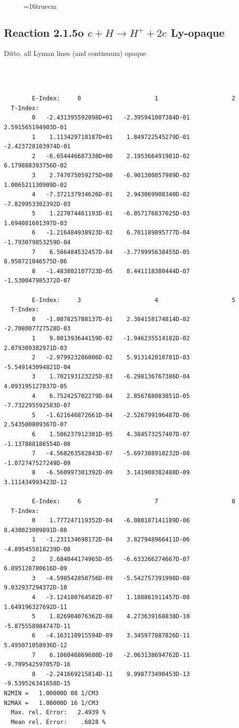 \documentclass[12pt,dvipdfmx]{article}
\begin{document}
\begin{figure} \label{2.1.5iFU}
\epsfxsize=16truecm
\end{figure}
\newpage


\subsection{
Reaction 2.1.5o $ e + H \rightarrow H^+ + 2e $  Ly-opaque}


Ditto, all Lyman lines (and continuum) opaque


\begin{small}\begin{verbatim}



        E-Index:     0                     1                     2
  T-Index:
        0   -2.431395592098D+01   -2.395941007384D-01    2.591565194903D-01
        1    1.113429718187D+01    1.849722545279D-01   -2.423728103974D-01
        2   -6.654446687338D+00    2.195366491981D-02    6.179888393756D-02
        3    2.747075059275D+00   -6.901300857989D-02    1.006521130909D-02
        4   -7.372137934626D-01    2.943069908340D-02   -7.829953302392D-03
        5    1.227074461193D-01   -6.057176837025D-03    1.694081601397D-03
        6   -1.216484938923D-02    6.701189895777D-04   -1.793079853259D-04
        7    6.566484532457D-04   -3.779995638455D-05    8.950721046575D-06
        8   -1.483802107723D-05    8.441118380444D-07   -1.530047985372D-07

        E-Index:     3                     4                     5
  T-Index:
        0   -1.087825788137D-01    2.304158174814D-02   -2.708007727528D-03
        1    9.801393644159D-02   -1.946235514182D-02    2.079309382971D-03
        2   -2.979923286006D-02    5.913142010781D-03   -5.549143094821D-04
        3    1.702193123225D-03   -6.298136767386D-04    4.093195127037D-05
        4    6.752425702279D-04    2.856788083851D-05   -7.732295592583D-07
        5   -1.621646872661D-04   -2.526799196487D-06    2.543500809367D-07
        6    1.506237912301D-05    4.384573257407D-07   -1.137888186554D-08
        7   -4.568263582843D-07   -5.697388918232D-08   -1.072747527249D-09
        8   -6.560997301392D-09    3.141908302488D-09    3.111434993423D-12

        E-Index:     6                     7                     8
  T-Index:
        0    1.777247119352D-04   -6.080187141189D-06    8.438023009891D-08
        1   -1.231134698172D-04    3.827948966411D-06   -4.895455818239D-08
        2    2.684044174965D-05   -6.633266274667D-07    6.895128780616D-09
        3   -4.598542858756D-09   -5.542757391998D-08    9.032937294372D-10
        4   -3.124180764582D-07    1.188861911457D-08    1.649196327692D-11
        5    1.826904076362D-08    4.273639168838D-10   -5.875558984747D-11
        6   -4.163110915594D-09    3.345977887826D-11    5.495071058936D-12
        7    6.106046869680D-10   -2.063138694762D-11   -9.709542597057D-16
        8   -2.241669215814D-11    9.998773490453D-13   -9.539526341658D-15
N2MIN =   1.00000D 08 1/CM3
N2MAX =   1.00000D 16 1/CM3
  Max. rel. Error:   2.4939 %
  Mean rel. Error:    .6828 %


\end{verbatim}
\end{small}
\end{document}
